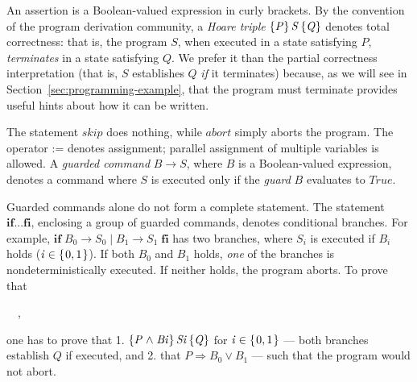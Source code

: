 \documentclass[runningheads]{llncs}
\newcommand{\Conid}[1]{\mathit{#1}}
\newcommand{\Varid}[1]{\mathit{#1}}
\def\resethooks{%
  \global\let\SaveRestoreHook\empty
  \global\let\ColumnHook\empty}
\let\hspre\empty
\let\hspost\empty
\let\Varid\mathit
\let\Conid\mathit
\newcounter{linenum}
\begin{document}
An assertion is a Boolean-valued expression in curly brackets.
By the convention of the program derivation community, a \emph{Hoare triple} \ensuremath{\htriple{\Conid{P}}{\Conid{S}}{\Conid{Q}}} denotes total correctness: that is, the program \ensuremath{\Conid{S}}, when executed in a state satisfying \ensuremath{\Conid{P}}, \emph{terminates} in a state satisfying \ensuremath{\Conid{Q}}.
We prefer it than the partial correctness interpretation (that is, \ensuremath{\Conid{S}} establishes \ensuremath{\Conid{Q}} \emph{if} it terminates) because, as we will see in Section~\ref{sec:programming-example}, that the program must terminate provides useful hints about how it can be written.

%

The statement \ensuremath{\Varid{skip}} does nothing, while \ensuremath{\Varid{abort}} simply aborts the program.
The operator \ensuremath{\mathbin{:=}} denotes assignment; parallel assignment of multiple variables is allowed.
A \emph{guarded command} \ensuremath{\Conid{B}\to \Conid{S}}, where \ensuremath{\Conid{B}} is a Boolean-valued expression, denotes a command where \ensuremath{\Conid{S}} is executed only if the \emph{guard} \ensuremath{\Conid{B}} evaluates to \ensuremath{\Conid{True}}.

Guarded commands alone do not form a complete statement.
The statement \ensuremath{\mathbf{if}\mathbin{...}\mathbf{fi}}, enclosing a group of guarded commands, denotes conditional branches.
For example, \ensuremath{\mathbf{if}\;\Conid{B}_{0}\to \Conid{S}_{0}\mid \Conid{B}_{1}\to \Conid{S}_{1}\;\mathbf{fi}} has two branches, where \ensuremath{\Conid{S}_{i}} is executed if \ensuremath{\Conid{B}_{i}} holds (\ensuremath{\Varid{i}\in \{\mskip1.5mu \mathrm{0},\mathrm{1}\mskip1.5mu\}}).
If both \ensuremath{\Conid{B}_{0}} and \ensuremath{\Conid{B}_{1}} holds, \emph{one} of the branches is nondeterministically executed.
If neither holds, the program aborts.
To prove that
\begin{hscode}\linenumsetup\printlinebegin\SaveRestoreHook
\column{B}{@{}>{\hspre}l<{\hspost}@{}}%
\column{E}{@{}>{\hspre}l<{\hspost}@{}}%
\>[B]{}\htriple{\Conid{P}}{\mathbf{if}\;\Conid{B}_{0}\to \Conid{S}_{0}\mid \Conid{B}_{1}\to \Conid{S}_{1}\;\mathbf{fi}}{\Conid{Q}}~~,{}\<[E]%
\printlineend\ColumnHook
\end{hscode}\resethooks
one has to prove that 1. \ensuremath{\htriple{\Conid{P}\mathrel{\wedge}\Conid{Bi}}{\Conid{Si}}{\Conid{Q}}} for \ensuremath{\Varid{i}\in \{\mskip1.5mu \mathrm{0},\mathrm{1}\mskip1.5mu\}} --- both branches establish \ensuremath{\Conid{Q}} if executed, and 2. that \ensuremath{\Conid{P}\mathrel{\Rightarrow}\Conid{B}_{0}\mathrel{\vee}\Conid{B}_{1}} --- such that the program would not abort.
\end{document}
